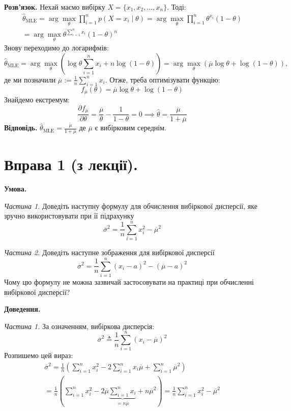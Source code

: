 \documentclass[14pt]{extarticle}
\begin{document}
\textbf{Розв'язок.} Нехай маємо вибірку $X=\{x_1,x_2,\dots,x_n\}$. Тоді:
\begin{gather*}
\hat{\theta}_{\text{MLE}} = \arg\max_{\theta} \prod_{i=1}^n p(X=x_i\mid \theta) = \arg\max_{\theta} \prod_{i=1}^n \theta^{x_i}(1-\theta) \\
= \arg\max_{\theta} \theta^{\sum_{i=1}^n x_i}(1-\theta)^n
\end{gather*}
Знову переходимо до логарифмів:
\[
\hat{\theta}_{\text{MLE}} = \arg\max_{\theta}\left(\log\theta\sum_{i=1}^n x_i + n\log(1-\theta)\right) = \arg\max_{\theta}\left(\overline{\mu}\log\theta + \log(1-\theta) \right),
\]
де ми позначили $\overline{\mu} := \frac{1}{n}\sum_{i=1}^n x_i$. Отже, треба оптимізувати функцію:
\[
f_{\overline{\mu}}(\theta) = \overline{\mu}\log\theta + \log(1-\theta)
\]
Знайдемо екстремум:
\[
\frac{\partial f_{\overline{\mu}}}{\partial \theta} = \frac{\overline{\mu}}{\theta} - \frac{1}{1-\theta} = 0 \implies \hat{\theta} = \frac{\overline{\mu}}{1+\overline{\mu}}
\]
\textbf{Відповідь.} $\hat{\theta}_{\text{MLE}} = \frac{\overline{\mu}}{1+\overline{\mu}}$ де $\overline{\mu}$ є вибірковим середнім. 

\section*{Вправа 1 (з лекції).}

\textbf{Умова.} 

\textit{Частина 1.} Доведіть наступну формулу для обчислення вибіркової дисперсії, яке зручно використовувати при її підрахунку
\[
\overline{\sigma}^2 = \frac{1}{n}\sum_{i=1}^n x_i^2 - \overline{\mu}^2
\]

\textit{Частина 2.} Доведіть наступне зображення для вибіркової дисперсії
\[
\overline{\sigma}^2 = \frac{1}{n}\sum_{i=1}^n (x_i-a)^2 - (\overline{\mu}-a)^2
\]
Чому цю формулу не можна зазвичай застосовувати на практиці при обчисленні вибіркової дисперсії?

\textbf{Доведення.} 

\textit{Частина 1.} За означенням, вибіркова дисперсія:
\[
\overline{\sigma}^2 \triangleq \frac{1}{n}\sum_{i=1}^n (x_i-\overline{\mu})^2
\]
Розпишемо цей вираз:
\begin{gather*}
\overline{\sigma}^2 = \frac{1}{n}\left(\sum_{i=1}^n x_i^2 - 2\sum_{i=1}^n x_i\overline{\mu} + \sum_{i=1}^n \overline{\mu}^2\right) \\
= \frac{1}{n}\left(\sum_{i=1}^n x_i^2 - 2\overline{\mu}\underbrace{\sum_{i=1}^nx_i}_{=n\overline{\mu}} + n\overline{\mu}^2\right) = \frac{1}{n}\sum_{i=1}^n x_i^2 - \overline{\mu}^2
\end{gather*}
\end{document}
